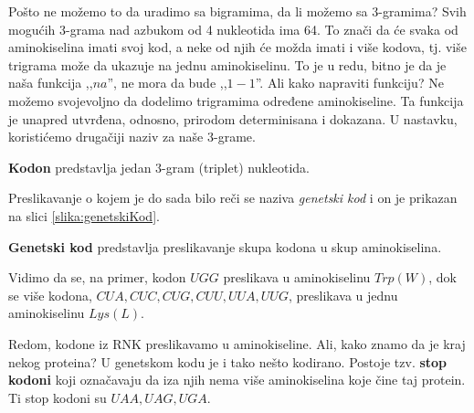 Pošto ne možemo to da uradimo sa bigramima, da li možemo sa $3$-gramima? Svih mogućih $3$-grama nad azbukom od 4 nukleotida ima 64. To znači da će svaka od aminokiselina imati svoj kod, a neke od njih će možda imati i više kodova, tj. više trigrama može da ukazuje na jednu aminokiselinu. To je u redu, bitno je da je naša funkcija ,,$na$'', ne mora da bude ,,$1-1$''. Ali kako napraviti funkciju? Ne možemo svojevoljno da dodelimo trigramima određene aminokiseline. Ta funkcija je unapred utvrđena, odnosno, prirodom determinisana i dokazana. U nastavku, koristićemo drugačiji naziv za naše $3$-grame. 

\begin{definicija}
\textbf{Kodon} predstavlja jedan $3$-gram (triplet) nukleotida. 
\end{definicija}

\noindent Preslikavanje o kojem je do sada bilo reči se naziva \textit{genetski kod} i on je prikazan na slici \ref{slika:genetskiKod}.

\begin{definicija}
\textbf{Genetski kod} predstavlja preslikavanje skupa kodona u skup aminokiselina. 
\end{definicija}

Vidimo da se, na primer, kodon $UGG$ preslikava u aminokiselinu $Trp (W)$, dok se više kodona, $CUA, CUC, CUG, CUU, UUA, UUG$, preslikava u jednu aminokiselinu $Lys (L)$. 

Redom, kodone iz RNK preslikavamo u aminokiseline. Ali, kako znamo da je kraj nekog proteina? U genetskom kodu je i tako nešto kodirano. Postoje tzv. \textbf{stop kodoni} koji označavaju da iza njih nema više aminokiselina koje čine taj protein. Ti stop kodoni su $UAA, UAG, UGA$. 



